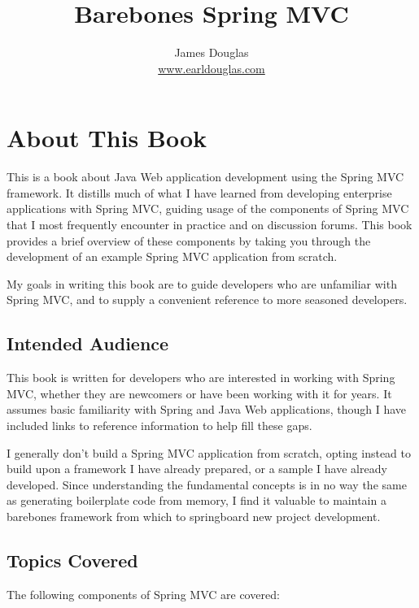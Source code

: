 \documentclass{article}
\begin{document}
\title{Barebones Spring MVC}
\author{James Douglas\\\href{http://www.earldouglas.com/}{www.earldouglas.com}}
\maketitle
\tableofcontents
\newpage
\setlength{\parskip}{\baselineskip}
\pagebreak
\section{About This Book}

This is a book about Java Web application development using the Spring MVC framework.  It distills much of what I have learned from developing enterprise applications with Spring MVC, guiding usage of the components of Spring MVC that I most frequently encounter in practice and on discussion forums.  This book provides a brief overview of these components by taking you through the development of an example Spring MVC application from scratch.

My goals in writing this book are to guide developers who are unfamiliar with Spring MVC, and to supply a convenient reference to more seasoned developers.

\subsection{Intended Audience}

This book is written for developers who are interested in working with Spring MVC, whether they are newcomers or have been working with it for years.  It assumes basic familiarity with Spring and Java Web applications, though I have included links to reference information to help fill these gaps.

I generally don't build a Spring MVC application from scratch, opting instead to build upon a framework I have already prepared, or a sample I have already developed.  Since understanding the fundamental concepts is in no way the same as generating boilerplate code from memory, I find it valuable to maintain a barebones framework from which to springboard new project development.

\subsection{Topics Covered}

The following components of Spring MVC are covered:
\end{document}
